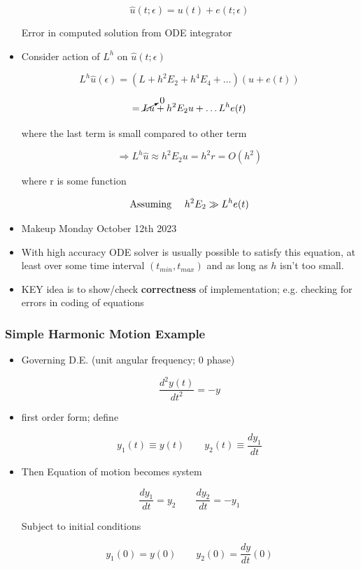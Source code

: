 \begin{itemize}
    \[ \hat{u}(t;\epsilon) = u(t) + e(t; \epsilon)\]

    Error in computed solution from ODE integrator

    \item Consider action of $L^h$ on $\hat{u}(t;\epsilon)$

    \[ L^h \hat{u}(\epsilon) = (L+h^2E_2 +h^4E_4+ \ldots ) 
 (u+e(t))\]

    \[ = \cancelto{0}{Lu} + h^2 E_2 u + \ldots L^h e(t)\]
    
    where the last term is small compared to other term


    \[ \Rightarrow L^h \hat{u} \approx h^2 E_2 u = h^2r = O(h^2) \]

    where r is some function

    \[ \text{Assuming \quad } h^2 E_2 \gg L^h e(t)\]

    \item Makeup Monday October 12th 2023

    \item With high accuracy ODE solver is usually possible to satisfy this equation, at least over some time interval $(t_{min}, t_{max})$ and as long as $h$ isn't too small.

    \item KEY idea is to show/check \textbf{correctness} of implementation; e.g. checking for errors in coding of equations
\end{itemize}

\subsubsection{Simple Harmonic Motion Example}

\begin{itemize}
    \item Governing D.E. (unit angular frequency; 0 phase)

    \begin{equation}
        \frac{d^2y(t)}{dt^2} = -y
    \end{equation} 

    \item first order form; define

    \[ y_1(t) \equiv y(t) \qquad y_2(t)\equiv \frac{dy_1}{dt}\]
    \item Then Equation of motion becomes system 

    \[ \frac{dy_1}{dt} = y_2 \qquad \frac{dy_2}{dt} = -y_1\]

    Subject to initial conditions

    \[ y_1(0) = y(0) \qquad y_2(0) = \frac{dy}{dt}(0)\]
\end{itemize}


